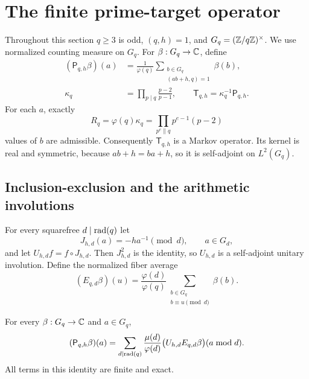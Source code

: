 \section{The finite prime-target operator}
\label{sec:local-operator}

Throughout this section $q\geq3$ is odd, $(q,h)=1$, and
$G_q=(\mathbb Z/q\mathbb Z)^\times$.  We use normalized counting measure on $G_q$.
For $\beta:G_q\to\mathbb C$, define
\begin{align}
 (\mathsf P_{q,h}\beta)(a)
 &=\frac1{\varphi(q)}
   \sum_{\substack{b\in G_q\\(ab+h,q)=1}}\beta(b),
 \label{eq:P-definition}\\
 \kappa_q
 &=\prod_{p\mid q}\frac{p-2}{p-1},
 \qquad
 \mathsf T_{q,h}=\kappa_q^{-1}\mathsf P_{q,h}.
 \label{eq:T-definition}
\end{align}
For each $a$, exactly
\begin{equation}\label{eq:row-degree}
 R_q=\varphi(q)\kappa_q
 =\prod_{p^e\parallel q}p^{e-1}(p-2)
\end{equation}
values of $b$ are admissible.  Consequently $\mathsf T_{q,h}$ is a Markov
operator.  Its kernel is real and symmetric, because $ab+h=ba+h$, so it is
self-adjoint on $L^2(G_q)$.

\subsection{Inclusion-exclusion and the arithmetic involutions}

For every squarefree $d\mid\operatorname{rad}(q)$ let
\begin{equation}\label{eq:J-definition}
 J_{h,d}(a)=-h a^{-1}\pmod d,
 \qquad a\in G_d,
\end{equation}
and let $U_{h,d}f=f\circ J_{h,d}$.  Then $J_{h,d}^2$ is the identity, so
$U_{h,d}$ is a self-adjoint unitary involution.  Define the normalized fiber
average
\begin{equation}\label{eq:fiber-average}
 (E_{q,d}\beta)(u)
 =\frac{\varphi(d)}{\varphi(q)}
  \sum_{\substack{b\in G_q\\b\equiv u\pmod d}}\beta(b).
\end{equation}

\begin{proposition}
\label{prop:involution-bundle}
For every $\beta:G_q\to\mathbb C$ and $a\in G_q$,
\begin{equation}\label{eq:involution-bundle}
 (\mathsf P_{q,h}\beta)(a)
 =\sum_{d\mid\operatorname{rad}(q)}
   \frac{\mu(d)}{\varphi(d)}
   \bigl(U_{h,d}E_{q,d}\beta\bigr)(a\bmod d).
\end{equation}
All terms in this identity are finite and exact.
\end{proposition}

